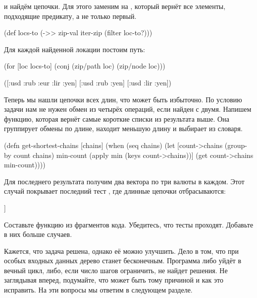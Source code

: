 и найдём цепочки. Для этого заменим  на , который вернёт все
элементы, подходящие предикату, а не только первый.

\begin{english}
  \begin{clojure}
(def locs-to
  (->> zip-val
       iter-zip
       (filter loc-to?)))
  \end{clojure}
\end{english}

Для каждой найденной локации постоим путь:

\begin{english}
  \begin{clojure}
(for [loc locs-to]
  (conj (zip/path loc) (zip/node loc)))

([:usd :rub :eur :lir :yen]
 [:usd :rub :yen]
 [:usd :lir :yen])
  \end{clojure}
\end{english}

Теперь мы нашли цепочки всех длин, что может быть избыточно. По условию задачи
нам не нужен обмен из четырёх операций, если найден с двумя. Напишем функцию,
которая вернёт самые короткие списки из результата выше. Она группирует обмены
по длине, находит меньшую длину и выбирает из словаря.

\begin{english}
  \begin{clojure}
(defn get-shortest-chains
  [chains]
  (when (seq chains)
    (let [count->chains (group-by count chains)
          min-count (apply min (keys count->chains))]
      (get count->chains min-count))))
  \end{clojure}
\end{english}

Для последнего результата получим два вектора по три валюты в каждом. Этот
случай покрывает последний тест , где длинные цепочки
отбрасываются:

\begin{english}
  \begin{clojure}
[[:usd :rub :yen] [:usd :lir :yen]]
  \end{clojure}
\end{english}

Составьте функцию  из фрагментов кода. Убедитесь, что тесты
проходят. Добавьте в них больше случаев.

Кажется, что задача решена, однако её можно улучшить. Дело в том, что при особых
входных данных дерево станет бесконечным. Программа либо уйдёт в вечный цикл,
либо, если число шагов ограничить, не найдет решения. Не заглядывая вперед,
подумайте, что может быть тому причиной и как это исправить. На эти вопросы мы
ответим в следующем разделе.

